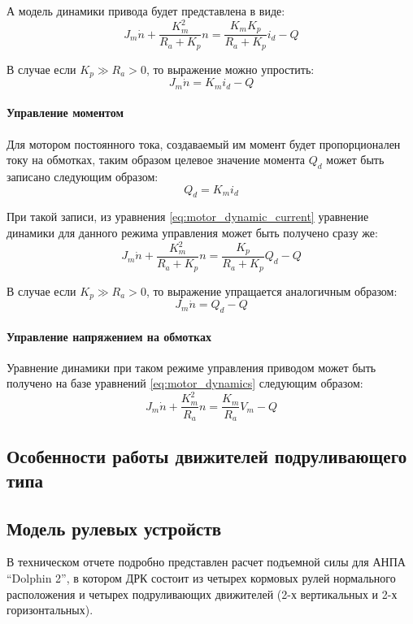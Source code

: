 А модель динамики привода будет представлена в виде:
\begin{equation}
    \label{eq:motor_dynamic_current}
    J_m\dot{n} + \frac{K_m^2}{R_a+K_p}n = \frac{K_m K_p}{R_a + K_p}i_d - Q
\end{equation}

В случае если $K_p \gg R_a > 0$, то выражение можно упростить:
\begin{equation}
    J_m\dot{n} = K_m i_d - Q  
\end{equation}

\paragraph{Управление моментом}
Для мотором постоянного тока, создаваемый им момент будет пропорционален току на обмотках, таким образом целевое значение момента $Q_d$ может быть записано следующим образом:
\begin{equation}
    Q_d = K_m i_d
\end{equation}

При такой записи, из уравнения \ref{eq:motor_dynamic_current} уравнение динамики для данного режима управления может быть получено сразу же:
\begin{equation}
    J_m\dot{n} + \frac{K_m^2}{R_a+K_p}n = \frac{K_p}{R_a + K_p}Q_d - Q
\end{equation}

В случае если $K_p \gg R_a > 0$, то выражение упращается аналогичным образом:
\begin{equation}
    J_m\dot{n} = Q_d - Q  
\end{equation}

\paragraph{Управление напряжением на обмотках}
Уравнение динамики при таком режиме управления приводом может быть получено на базе уравнений \ref{eq:motor_dynamics} следующим образом:
\begin{equation}
    J_m\dot{n} + \frac{K_m^2}{R_a}n = \frac{K_m}{R_a}V_m - Q
\end{equation}

\subsection{Особенности работы движителей подруливающего типа}

\subsection{Модель рулевых устройств}
В техническом отчете \cite{steenson2011control} подробно представлен расчет подъемной силы для АНПА ``Dolphin 2'', в котором ДРК состоит из четырех кормовых рулей нормального расположения и четырех подруливающих движителей (2-х вертикальных и 2-х горизонтальных).

